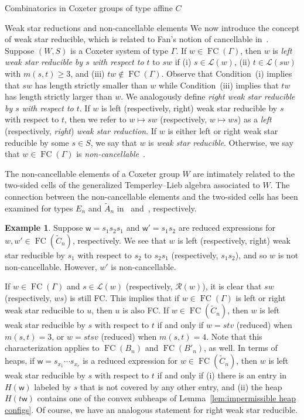 \documentclass[11pt]{amsart}
\theoremstyle{definition}
\newtheorem{example}[theorem]{Example}
\numberwithin{equation}{section}
\newcommand{\C}{\widetilde{C}}
\renewcommand{\L}{\mathcal{L}}
\newcommand{\R}{\mathcal{R}}
\renewcommand{\(}{\left(}
\renewcommand{\)}{\right)}
\newcommand{\w}{\mathsf{w}}
\DeclareMathOperator{\FC}{FC}
\begin{document}
\begin{section}{Combinatorics in Coxeter groups of type affine $C$}
\begin{subsection}{Weak star reductions and non-cancellable elements}
We now introduce the concept of weak star reducible, which is related to Fan's notion of cancellable in~\cite{Fan1997}.   Suppose $(W,S)$ is a Coxeter system of type $\Gamma$.  If $w \in \FC(\Gamma)$, then $w$ is \emph{left weak star reducible by $s$ with respect to $t$} to $sw$ if (i) $s\in \L(w)$, (ii) $t \in \L(sw)$ with $m(s,t) \geq 3$, and (iii) $tw \notin \FC(\Gamma)$.  Observe that Condition~(i) implies that $sw$ has length strictly smaller than $w$ while Condition~(iii) implies that $tw$ has length strictly larger than $w$.  We analogously define \emph{right weak star reducible by $s$ with respect to $t$}.  If $w$ is left (respectively, right) weak star reducible by $s$ with respect to $t$, then we refer to $w\mapsto sw$ (respectively, $w\mapsto ws$) as a \emph{left} (respectively, \emph{right}) \emph{weak star reduction}. If $w$ is either left or right weak star reducible by some $s\in S$, we say that $w$ is \emph{weak star reducible}.  Otherwise, we say that $w\in \FC(\Gamma)$ is \emph{non-cancellable}~\cite{Ernst2010}.  

The non-cancellable elements of a Coxeter group $W$ are intimately related to the two-sided cells of the generalized Temperley--Lieb algebra associated to $W$.  The connection between the non-cancellable elements and the two-sided cells has been examined for types $E_n$ and $\widetilde{A}_n$ in~\cite{Fan1997} and~\cite{Fan1999}, respectively.

\begin{example}
Suppose $\w=s_{1}s_{2}s_{1}$ and $\w'=s_{1}s_{2}$ are reduced expressions for $w,w' \in \FC(\C_{n})$, respectively.  We see that $w$ is left (respectively, right) weak star reducible by $s_{1}$ with respect to $s_{2}$ to $s_2 s_1$ (respectively, $s_1 s_2$), and so $w$ is not non-cancellable.  However, $w'$ is non-cancellable.
\end{example}

If $w\in \FC(\Gamma)$ and $s \in \L(w)$ (respectively, $\R(w)$), it is clear that $sw$ (respectively, $ws$) is still FC.  This implies that if $w \in \FC(\Gamma)$ is left or right weak star reducible to $u$, then $u$ is also FC. If $w \in \FC(\C_{n})$, then $w$ is left weak star reducible by $s$ with respect to $t$ if and only if $w=stv$ (reduced) when $m(s,t)=3$, or $w=stsv$ (reduced) when $m(s,t)=4$.   Note that this characterization applies to $\FC(B_{n})$ and $\FC(B'_{n})$, as well.  In terms of heaps, if $\w=s_{x_1}\cdots s_{x_r}$ is a reduced expression for $w \in \FC(\C_{n})$, then $w$ is left weak star reducible by $s$ with respect to $t$ if and only if (i) there is an entry in $H(\w)$ labeled by $s$ that is not covered by any other entry, and (ii) the heap $H(t\w)$ contains one of the convex subheaps of Lemma~\ref{lem:impermissible heap configs}.  Of course, we have an analogous statement for right weak star reducible.


\end{subsection}
\end{section}
\end{document}
